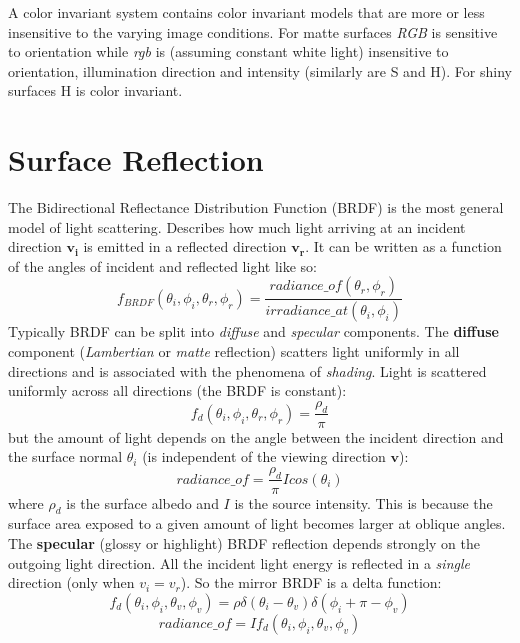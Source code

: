 \documentclass[a4paper,twocolumn]{article}
\begin{document}
A color invariant system contains color invariant models that are more or less
insensitive to the varying image conditions. For matte surfaces
\textit{RGB} is sensitive to orientation while \textit{rgb} is (assuming
constant white light) insensitive to orientation, illumination direction and
intensity (similarly are S and H). For shiny surfaces H is color invariant.


\section{Surface Reflection}
The Bidirectional Reflectance Distribution Function (BRDF) is the most general
model of light scattering. Describes how much light arriving at an incident
direction $\mathbf{v_i}$ is emitted in a reflected direction $\mathbf{v_r}$. It
can be written as a function of the angles of incident and reflected light like so:
\begin{equation}
f_{BRDF}(\theta_i, \phi_i, \theta_r, \phi_r) =
	\frac{radiance\_of(\theta_r, \phi_r)}{irradiance\_at(\theta_i, \phi_i)}
\end{equation}
Typically BRDF can be split into \textit{diffuse} and \textit{specular}
components. The \textbf{diffuse} component (\textit{Lambertian} or \textit{matte}
reflection) scatters light uniformly in all directions and is associated with
the phenomena of \textit{shading}. Light is scattered uniformly across all
directions (the BRDF is constant):
\begin{equation}
f_d(\theta_i, \phi_i, \theta_r, \phi_r) = \frac{\rho_d}{\pi}
\end{equation}
but the amount of light depends on the angle between the incident direction and
the surface normal $\theta_i$ (is independent of the viewing direction
$\mathbf{v}$):
\begin{equation}
radiance\_of = \frac{\rho_d}{\pi} I cos(\theta_i)
\end{equation}
where $\rho_d$ is the surface albedo and $I$ is the source intensity.
This is because the surface area exposed to a given amount of light becomes
larger at oblique angles. The \textbf{specular} (glossy or highlight) BRDF reflection
depends strongly on the outgoing light direction. All the incident light energy
is reflected in a \textit{single} direction (only when $v_i = v_r$). So the
mirror BRDF is a delta function:
\begin{equation}
f_d(\theta_i, \phi_i, \theta_v, \phi_v) = \rho \delta(\theta_i - \theta_v)
\delta(\phi_i + \pi - \phi_v)
\end{equation}
\begin{equation}
radiance\_of = I f_d(\theta_i, \phi_i, \theta_v, \phi_v)
\end{equation}
\end{document}
